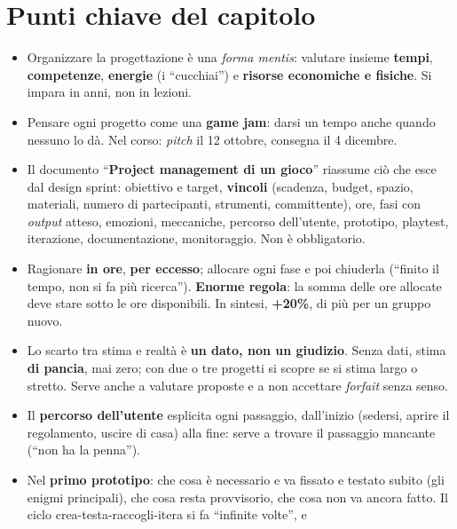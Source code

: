 \section*{Punti chiave del capitolo}

\begin{itemize}
  \item Organizzare la progettazione è una \emph{forma mentis}: valutare insieme
        \textbf{tempi}, \textbf{competenze}, \textbf{energie} (i ``cucchiai'') e
        \textbf{risorse economiche e fisiche}. Si impara in anni, non in lezioni.
  \item Pensare ogni progetto come una \textbf{game jam}: darsi un tempo anche quando
        nessuno lo dà. Nel corso: \emph{pitch} il 12 ottobre, consegna il 4 dicembre.
  \item Il documento ``\textbf{Project management di un gioco}'' riassume ciò che esce
        dal design sprint: obiettivo e target, \textbf{vincoli} (scadenza, budget,
        spazio, materiali, numero di partecipanti, strumenti, committente), ore, fasi
        con \emph{output} atteso, emozioni, meccaniche, percorso dell'utente,
        prototipo, playtest, iterazione, documentazione, monitoraggio. Non è
        obbligatorio.
  \item Ragionare \textbf{in ore}, \textbf{per eccesso}; allocare ogni fase e poi
        chiuderla (``finito il tempo, non si fa più ricerca''). \textbf{Enorme
        regola}: la somma delle ore allocate deve stare sotto le ore disponibili.
        In sintesi, \textbf{+20\%}, di più per un gruppo nuovo.
  \item Lo scarto tra stima e realtà è \textbf{un dato, non un giudizio}. Senza dati,
        stima \textbf{di pancia}, mai zero; con due o tre progetti si scopre se si
        stima largo o stretto. Serve anche a valutare proposte e a non accettare
        \emph{forfait} senza senso.
  \item Il \textbf{percorso dell'utente} esplicita ogni passaggio, dall'inizio
        (sedersi, aprire il regolamento, uscire di casa) alla fine: serve a trovare il
        passaggio mancante (``non ha la penna'').
  \item Nel \textbf{primo prototipo}: che cosa è necessario e va fissato e testato
        subito (gli enigmi principali), che cosa resta provvisorio, che cosa non va
        ancora fatto. Il ciclo crea-testa-raccogli-itera si fa ``infinite volte'', e

\end{itemize}
